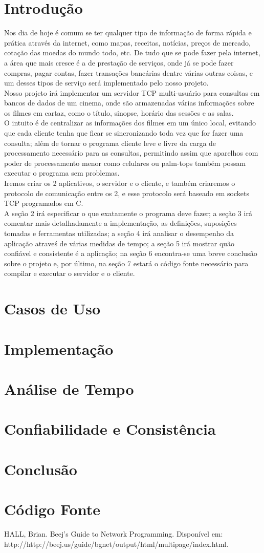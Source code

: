 \documentclass[11pt,twoside]{article}
\begin{document}
\section{Introdução}
Nos dia de hoje é comum se ter qualquer tipo de informação de forma rápida e prática através da internet, como mapas, receitas, notícias, preços de mercado, cotação das moedas do mundo todo, etc. De tudo que se pode fazer pela internet, a área que mais cresce é a de prestação de serviços, onde já se pode fazer compras, pagar contas, fazer transações bancárias dentre várias outras coisas, e um desses tipos de serviço será implementado pelo nosso projeto.\\
Nosso projeto irá implementar um servidor TCP multi-usuário para consultas em bancos de dados de um cinema, onde são armazenadas várias informações sobre os filmes em cartaz, como o título, sinopse, horário das sessões e as salas.\\
O intuito é de centralizar as informações dos filmes em um único local, evitando que cada cliente tenha que ficar se sincronizando toda vez que for fazer uma consulta; além de tornar o programa cliente leve e livre da carga de processamento necessário para as consultas, permitindo assim que aparelhos com poder de processamento menor como celulares ou palm-tops também possam executar o programa sem problemas.\\
Iremos criar os 2 aplicativos, o servidor e o cliente, e também criaremos o protocolo de comunicação entre os 2, e esse protocolo será baseado em sockets TCP programados em C.\\
A seção 2 irá especificar o que exatamente o programa deve fazer; a seção 3 irá comentar mais detalhadamente a implementação, as definições, suposições tomadas e ferramentas utilizadas; a seção 4 irá analisar o desempenho da aplicação atraveś de várias medidas de tempo; a seção 5 irá mostrar quão confiável e consistente é a aplicação; na seção 6 encontra-se uma breve conclusão sobre o projeto e, por último, na seção 7 estará o código fonte necessário para compilar e executar o servidor e o cliente.


\section{Casos de Uso}
\section{Implementação}
\section{Análise de Tempo}
\section{Confiabilidade e Consistência}
\section{Conclusão}
\section{Código Fonte}

\begin{thebibliography}{99}
 HALL, Brian. Beej's Guide to Network Programming. Disponível em: http://http://beej.us/guide/bgnet/output/html/multipage/index.html.
\end{thebibliography}
\end{document}
